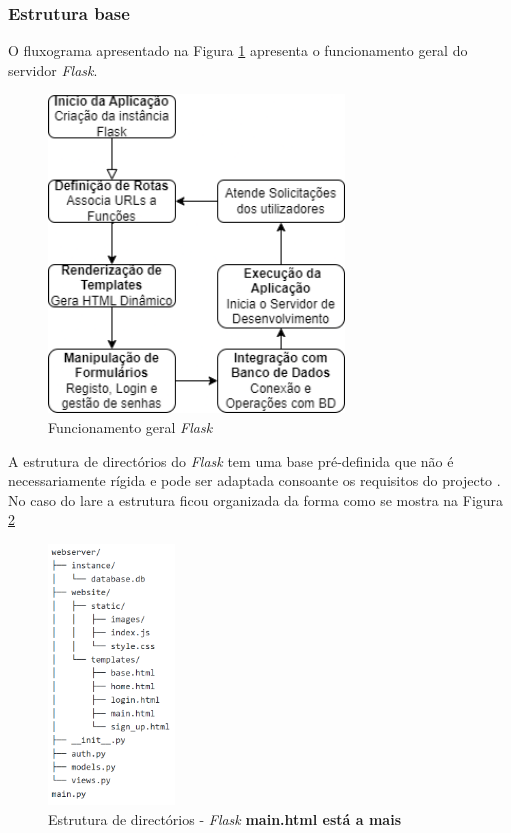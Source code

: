 \subsubsection{Estrutura base}
O fluxograma apresentado na Figura \ref{fig:funcflask} apresenta o funcionamento geral do servidor \textit{Flask}.

\begin{figure}[hbtp]
	\centering
	\includegraphics[width=0.7\textwidth]{figures/fluxograma_flask.drawio.png}
	\caption{Funcionamento geral \textit{Flask}}
	\label{fig:funcflask}
\end{figure}

A estrutura de directórios do \textit{Flask} tem uma base pré-definida que não é necessariamente rígida e pode ser adaptada consoante os requisitos do projecto \cite{Flask}. No caso do \acrshort{lare} a estrutura ficou organizada da forma como se mostra na Figura \ref{fig:estruturapastas}

\begin{figure}[hbtp]
	\centering
	\includegraphics[width=0.3\textwidth]{figures/tree_flask.png}
	\caption{Estrutura de directórios - \textit{Flask} \textbf{ main.html está a mais}}
	\label{fig:estruturapastas}
\end{figure}

